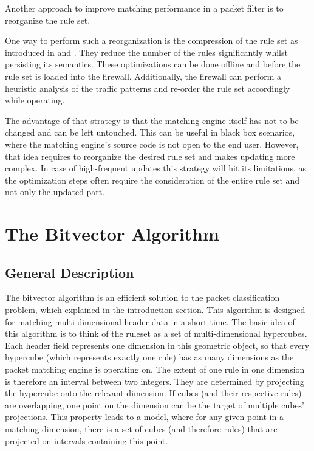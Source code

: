 \documentclass[a4paper,
		12pt,
		parskip=full,
		titlepage
		]{scrartcl}
\begin{document}
Another approach to improve matching performance in a packet filter is to reorganize the rule set.

One way to perform such a reorganization is the compression of the rule set as introduced in \cite{firewall_compressor} and \cite{redundancy_removal}.
They reduce the number of the rules significantly whilst persisting its semantics.
These optimizations can be done offline and before the rule set is loaded into the firewall.
Additionally, the firewall can perform a heuristic analysis of the traffic patterns and re-order the rule set accordingly while operating.

The advantage of that strategy is that the matching engine itself has not to be changed and can be left untouched.
This can be useful in black box scenarios, where the matching engine's source code is not open to the end user.
However, that idea requires to reorganize the desired rule set and makes updating more complex.
In case of high-frequent updates this strategy will hit its limitations, as the optimization steps often require the consideration of the entire rule set and not only the updated part.

\section{The Bitvector Algorithm}
\subsection{General Description}
The bitvector algorithm \cite{bv} is an efficient solution to the packet classification problem, which explained in the introduction section.
This algorithm is designed for matching multi-dimensional header data in a short time.
The basic idea of this algorithm is to think of the ruleset as a set of multi-dimensional hypercubes.
Each header field represents one dimension in this geometric object, so that every hypercube (which represents exactly one rule) has as many dimensions as the packet matching engine is operating on.
The extent of one rule in one dimension is therefore an interval between two integers.
They are determined by projecting the hypercube onto the relevant dimension.
If cubes (and their respective rules) are overlapping, one point on the dimension can be the target of multiple cubes' projections. 
This property leads to a model, where for any given point in a matching dimension, there is a set of cubes (and therefore rules) that are projected on intervals containing this point.
\end{document}
